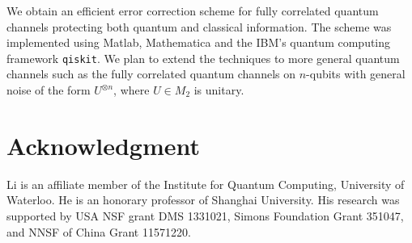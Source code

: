 \documentclass[11pt]{article}
\begin{document}
We obtain an efficient error correction  
scheme for fully correlated quantum channels
protecting both quantum and classical information.
The scheme was implemented using Matlab, Mathematica and
the IBM's quantum computing framework \verb|qiskit|.
We plan to extend the techniques to more general quantum channels 
such as the fully correlated quantum channels on $n$-qubits
with general noise of the form $U^{\otimes n}$, where $U \in M_2$
is unitary.

\section*{Acknowledgment}


Li is an affiliate member of the Institute for Quantum Computing,
University of Waterloo. He is an honorary professor of Shanghai
University. His research was supported by USA NSF grant DMS 1331021,
Simons Foundation Grant 351047, and NNSF of China Grant 11571220. 
\end{document}
